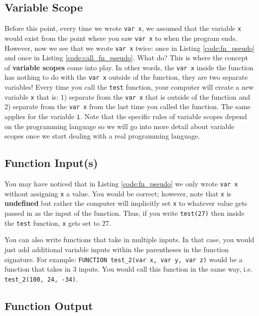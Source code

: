 \documentclass{article}
\begin{document}
\subsection{Variable Scope}

Before this point, every time we wrote \lstinline{var x}, we assumed that the variable \lstinline{x} would exist from the point where you saw \lstinline{var x} to when the program ends.
However, now we see that we wrote \lstinline{var x} twice: once in Listing \ref{code:fn_pseudo} and once in Listing \ref{code:call_fn_pseudo}.
What do?
This is where the concept of \textbf{variable scopes} come into play.
In other words, the \lstinline{var x} inside the function has nothing to do with the \lstinline{var x} outside of the function, they are two separate variables!
Every time you call the \lstinline{test} function, your computer will create a new variable \lstinline{x} that is: 1) separate from the \lstinline{var x} that is outside of the function and 2) separate from the \lstinline{var x} from the last time you called the function.
The same applies for the variable \lstinline{i}.
Note that the specific rules of variable scopes depend on the programming language so we will go into more detail about variable scopes once we start dealing with a real programming language.

\subsection{Function Input(s)}

You may have noticed that in Listing \ref{code:fn_pseudo} we only wrote \lstinline{var x} without assigning \lstinline{x} a value.
You would be correct; however, note that \lstinline{x} is \textbf{undefined} but rather the computer will implicitly set \lstinline{x} to whatever value gets passed in as the input of the function.
Thus, if you write \lstinline{test(27)} then inside the \lstinline{test} function, \lstinline{x} gets set to $27$.

You can also write functions that take in multiple inputs.
In that case, you would just add additional variable inputs within the parentheses in the function signature.
For example: \lstinline{FUNCTION test_2(var x, var y, var z)} would be a function that takes in $3$ inputs.
You would call this function in the same way, i.e. \lstinline{test_2(100, 24, -34)}.

\subsection{Function Output}
\end{document}
